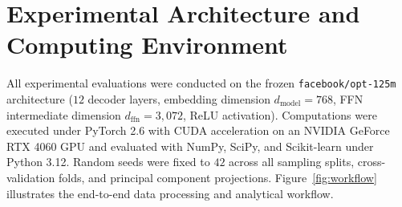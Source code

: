 \documentclass[12pt, a4paper, oneside]{report}
\theoremstyle{definition}
\begin{document}
\section{Experimental Architecture and Computing Environment}

All experimental evaluations were conducted on the frozen \texttt{facebook/opt-125m} architecture ($12$ decoder layers, embedding dimension $d_{\text{model}} = 768$, FFN intermediate dimension $d_{\text{ffn}} = 3{,}072$, ReLU activation). Computations were executed under PyTorch 2.6 with CUDA acceleration on an NVIDIA GeForce RTX 4060 GPU and evaluated with NumPy, SciPy, and Scikit-learn under Python 3.12. Random seeds were fixed to $42$ across all sampling splits, cross-validation folds, and principal component projections. Figure~\ref{fig:workflow} illustrates the end-to-end data processing and analytical workflow.
\end{document}
